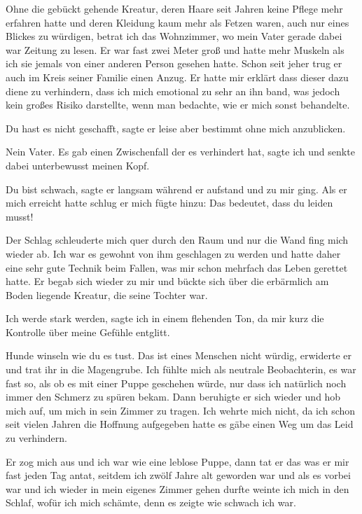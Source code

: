 \documentclass[11pt, a5paper]{article}
\begin{document}
\begin{spacing}{1.2}
		Ohne die gebückt gehende Kreatur, deren Haare seit Jahren keine Pflege mehr erfahren hatte und deren Kleidung kaum mehr als Fetzen waren, auch nur eines Blickes zu würdigen, betrat ich das Wohnzimmer, wo mein Vater gerade dabei war Zeitung zu lesen. Er war fast zwei Meter groß und hatte mehr Muskeln als ich sie jemals von einer anderen Person gesehen hatte. Schon seit jeher trug er auch im Kreis seiner Familie einen Anzug. Er hatte mir erklärt dass dieser dazu diene zu verhindern, dass ich mich emotional zu sehr an ihn band, was jedoch kein großes Risiko darstellte, wenn man bedachte, wie er mich sonst behandelte.
		
		\frqq Du hast es nicht geschafft\flqq , sagte er leise aber bestimmt ohne mich anzublicken.
		
		\frqq Nein Vater. Es gab einen Zwischenfall der es verhindert hat\flqq , sagte ich und senkte dabei unterbewusst meinen Kopf. 
		
		\frqq Du bist schwach\flqq , sagte er langsam während er aufstand und zu mir ging. Als er mich erreicht hatte schlug er mich fügte hinzu: \frqq Das bedeutet, dass du leiden musst!\flqq
		
		Der Schlag schleuderte mich quer durch den Raum und nur die Wand fing mich wieder ab. Ich war es gewohnt von ihm geschlagen zu werden und hatte daher eine sehr gute Technik beim Fallen, was mir schon mehrfach das Leben gerettet hatte. Er begab sich wieder zu mir und bückte sich über die erbärmlich am Boden liegende Kreatur, die seine Tochter war.
		
		\frqq Ich werde stark werden\flqq , sagte ich in einem flehenden Ton, da mir kurz die Kontrolle über meine Gefühle entglitt.
		
		\frqq Hunde winseln wie du es tust. Das ist eines Menschen nicht würdig\flqq , erwiderte er und trat ihr in die Magengrube. Ich fühlte mich als neutrale Beobachterin, es war fast so, als ob es mit einer Puppe geschehen würde, nur dass ich natürlich noch immer den Schmerz zu spüren bekam. Dann beruhigte er sich wieder und hob mich auf, um mich in sein Zimmer zu tragen. Ich wehrte mich nicht, da ich schon seit vielen Jahren die Hoffnung aufgegeben hatte es gäbe einen Weg um das Leid zu verhindern.
		
		Er zog mich aus und ich war wie eine leblose Puppe, dann tat er das was er mir fast jeden Tag antat, seitdem ich zwölf Jahre alt geworden war und als es vorbei war und ich wieder in mein eigenes Zimmer gehen durfte weinte ich mich in den Schlaf, wofür ich mich schämte, denn es zeigte wie schwach ich war.\newpage
		

\end{spacing}
\end{document}
